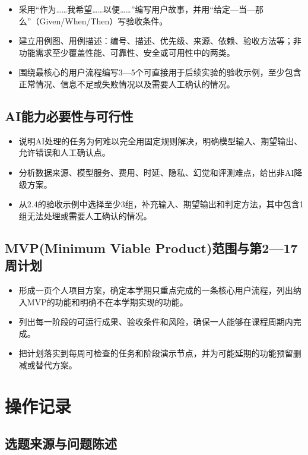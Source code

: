 \documentclass[UTF8,12pt,a4paper]{ctexart}
\begin{document}
\begin{itemize}
  \item 采用“作为……我希望……以便……”编写用户故事，并用“给定—当—那么”（Given/When/Then）写验收条件。
  \item 建立用例图、用例描述：编号、描述、优先级、来源、依赖、验收方法等；非功能需求至少覆盖性能、可靠性、安全或可用性中的两类。
  \item 围绕最核心的用户流程编写3—5个可直接用于后续实验的验收示例，至少包含正常情况、信息不足或失败情况以及需要人工确认的情况。
\end{itemize}

\subsection{AI能力必要性与可行性}

\begin{itemize}
  \item 说明AI处理的任务为何难以完全用固定规则解决，明确模型输入、期望输出、允许错误和人工确认点。
  \item 分析数据来源、模型服务、费用、时延、隐私、幻觉和评测难点，给出非AI降级方案。
  \item 从2.4的验收示例中选择至少3组，补充输入、期望输出和判定方法，其中包含1组无法处理或需要人工确认的情况。
\end{itemize}

\subsection{MVP(Minimum Viable Product)范围与第2—17周计划}

\begin{itemize}
  \item 形成一页个人项目方案，确定本学期只重点完成的一条核心用户流程，列出纳入MVP的功能和明确不在本学期实现的功能。
  \item 列出每一阶段的可运行成果、验收条件和风险，确保一人能够在课程周期内完成。
  \item 把计划落实到每周可检查的任务和阶段演示节点，并为可能延期的功能预留删减或替代方案。
\end{itemize}

\section{操作记录}

\subsection{选题来源与问题陈述}
\end{document}
